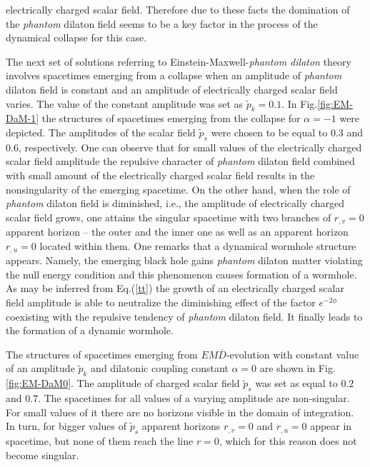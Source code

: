 \documentclass[aps,showpacs,nofootinbib,floatfix]{revtex4}
\newcommand{\tpe}{{\tilde p}}
\begin{document}
electrically charged scalar field. Therefore due to these facts 
the domination of the {\it phantom} dilaton field seems to be a key factor in the process of the dynamical collapse
for this case.
\par
The next set of solutions referring to Einstein-Maxwell-{\it phantom dilaton} theory involves 
spacetimes emerging from a collapse when an amplitude of {\it phantom} dilaton field is constant and 
an amplitude of electrically charged scalar field varies. The value of the constant amplitude was set as $\tpe_k=0.1$. 
In Fig.\ref{fig:EM-DaM-1} the structures of spacetimes emerging from the collapse for $\alpha=-1$ were depicted. The 
amplitudes of the scalar field $\tpe_s$ were chosen to be equal to $0.3$ and $0.6$, respectively. 
One can observe that for small values of the electrically charged scalar field amplitude
the repulsive character of {\it phantom} dilaton field combined with small amount of the electrically charged 
scalar field results
in the nonsingularity of the emerging spacetime.
On the other hand, when the role of {\it phantom} dilaton field is diminished, i.e., the 
amplitude of electrically charged scalar field grows, one 
attains the singular spacetime with two branches of $r_{,v}=0$ apparent horizon -- the outer and the inner one 
as well as an apparent horizon $r_{,u}=0$ located within them. One remarks that a dynamical wormhole structure appears. 
Namely, the emerging black hole gains {\it phantom} dilaton matter violating 
the null energy condition and this phenomenon causes formation of a wormhole.\\
As may be inferred from Eq.(\ref{tt}) the growth of an electrically charged scalar field amplitude 
is able to neutralize the diminishing effect of the factor $e^{-2 \phi}$ coexisting 
with the repulsive tendency of {\it phantom} dilaton field. It finally leads to the formation of a dynamic wormhole.
\par
The structures of spacetimes emerging from $EM\overline{D}$-evolution with constant value of an 
amplitude $\tpe_k$ and dilatonic coupling constant $\alpha=0$ are shown in Fig.\ref{fig:EM-DaM0}. The amplitude of charged scalar 
field $\tpe_s$ was set as equal to $0.2$ and $0.7$. The spacetimes for all values of a varying amplitude are 
non-singular. For small values of it there are no horizons visible in the domain of integration. In turn, for 
bigger 
values of $\tpe_s$ apparent horizons $r_{,v}=0$ and $r_{,u}=0$ appear in spacetime, but none of them 
reach the line $r=0$, which for this reason does not become singular. 
\end{document}

